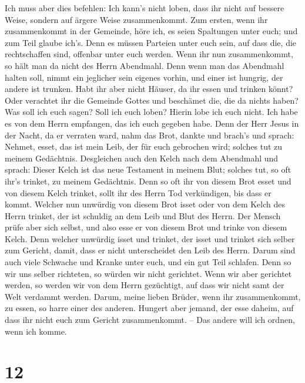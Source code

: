  Ich muss aber dies befehlen: Ich kann's nicht loben,
dass ihr nicht auf bessere Weise, sondern auf ärgere Weise
zusammenkommt.  Zum ersten, wenn ihr zusammenkommt in der
Gemeinde, höre ich, es seien Spaltungen unter euch; und zum Teil glaube
ich's.  Denn es müssen Parteien unter euch sein, auf dass
die, die rechtschaffen sind, offenbar unter euch werden. 
Wenn ihr nun zusammenkommt, so hält man da nicht des Herrn Abendmahl.
 Denn wenn man das Abendmahl halten soll, nimmt ein
jeglicher sein eigenes vorhin, und einer ist hungrig, der andere ist
trunken.  Habt ihr aber nicht Häuser, da ihr essen und
trinken könnt? Oder verachtet ihr die Gemeinde Gottes und beschämet die,
die da nichts haben? Was soll ich euch sagen? Soll ich euch loben?
Hierin lobe ich euch nicht.  Ich habe es von dem Herrn
empfangen, das ich euch gegeben habe. Denn der Herr Jesus in der Nacht,
da er verraten ward, nahm das Brot,  dankte und brach's
und sprach: Nehmet, esset, das ist mein Leib, der für euch gebrochen
wird; solches tut zu meinem Gedächtnis.  Desgleichen auch
den Kelch nach dem Abendmahl und sprach: Dieser Kelch ist das neue
Testament in meinem Blut; solches tut, so oft ihr's trinket, zu meinem
Gedächtnis.  Denn so oft ihr von diesem Brot esset und
von diesem Kelch trinket, sollt ihr des Herrn Tod verkündigen, bis dass
er kommt.  Welcher nun unwürdig von diesem Brot isset
oder von dem Kelch des Herrn trinket, der ist schuldig an dem Leib und
Blut des Herrn.  Der Mensch prüfe aber sich selbst, und
also esse er von diesem Brot und trinke von diesem Kelch.
 Denn welcher unwürdig isset und trinket, der isset und
trinket sich selber zum Gericht, damit, dass er nicht unterscheidet den
Leib des Herrn.  Darum sind auch viele Schwache und
Kranke unter euch, und ein gut Teil schlafen.  Denn so
wir uns selber richteten, so würden wir nicht gerichtet. 
Wenn wir aber gerichtet werden, so werden wir von dem Herrn gezüchtigt,
auf dass wir nicht samt der Welt verdammt werden.  Darum,
meine lieben Brüder, wenn ihr zusammenkommt, zu essen, so harre einer
des anderen.  Hungert aber jemand, der esse daheim, auf
dass ihr nicht euch zum Gericht zusammenkommt. -- Das andere will ich
ordnen, wenn ich komme.

\hypertarget{section-11}{%
\section{12}\label{section-11}}

